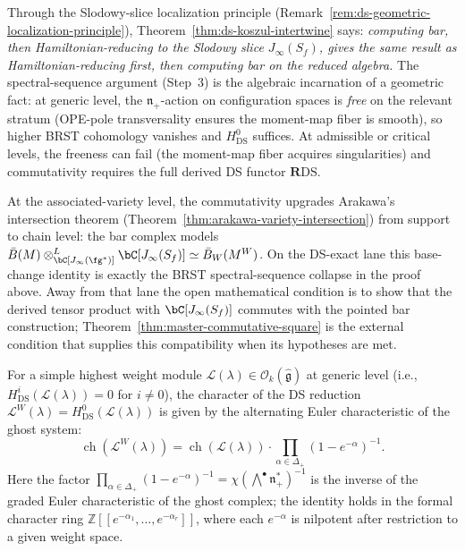\begin{remark}
\label{rem:ds-bar-geometric-content}
Through the Slodowy-slice localization principle
(Remark~\ref{rem:ds-geometric-localization-principle}),
Theorem~\ref{thm:ds-koszul-intertwine} says:
\emph{computing bar, then Hamiltonian-reducing to the Slodowy
slice $J_\infty(S_f)$, gives the same result as
Hamiltonian-reducing first, then computing bar on the reduced
algebra.} The spectral-sequence argument (Step~3) is the
algebraic incarnation of a geometric fact: at generic level,
the $\mathfrak{n}_+$-action on configuration spaces is
\emph{free} on the relevant stratum (OPE-pole transversality
ensures the moment-map fiber is smooth), so higher BRST
cohomology vanishes and $H^0_{\mathrm{DS}}$ suffices.
At admissible or critical levels, the freeness can fail
(the moment-map fiber acquires singularities) and
commutativity requires the full derived DS functor
$\mathbf{R}\mathrm{DS}$.

At the associated-variety level, the commutativity upgrades
Arakawa's intersection theorem
(Theorem~\ref{thm:arakawa-variety-intersection})
from support to chain level: the bar complex models
$\bar{B}(M) \otimes^L_{\bC[J_\infty(\fg^*)]}
\bC[J_\infty(S_f)] \simeq \bar{B}_W(M^W)$.
On the DS-exact lane this base-change identity is exactly the BRST
spectral-sequence collapse in the proof above. Away from that lane the
open mathematical condition is to show that the derived tensor product with
$\bC[J_\infty(S_f)]$ commutes with the pointed bar construction;
Theorem~\ref{thm:master-commutative-square} is the external condition
that supplies this compatibility when its hypotheses are met.
\end{remark}

\begin{corollary}
\label{cor:ds-character-compatibility}
For a simple highest weight module $\mathcal{L}(\lambda) \in
\mathcal{O}_k(\widehat{\mathfrak{g}})$ at generic level
\textup{(}i.e., $H^i_{\mathrm{DS}}(\mathcal{L}(\lambda)) = 0$
for $i \neq 0$\textup{)}, the character of the DS reduction
$\mathcal{L}^W(\lambda) = H^0_{\mathrm{DS}}(\mathcal{L}(\lambda))$
is given by the alternating Euler characteristic of the ghost
system\textup{:}
\begin{equation}\label{eq:ds-character}
\operatorname{ch}(\mathcal{L}^W(\lambda))
= \operatorname{ch}(\mathcal{L}(\lambda))
 \cdot \prod_{\alpha \in \Delta_+}(1 - e^{-\alpha})^{-1}.
\end{equation}
Here the factor
$\prod_{\alpha \in \Delta_+}(1 - e^{-\alpha})^{-1}
= \chi(\bigwedge^\bullet \mathfrak{n}_+^*)^{-1}$
is the inverse of the graded Euler characteristic of the ghost
complex; the identity holds in the formal character ring
$\mathbb{Z}[[e^{-\alpha_1}, \ldots, e^{-\alpha_r}]]$, where
each $e^{-\alpha}$ is nilpotent after restriction to a given
weight space.
\end{corollary}

